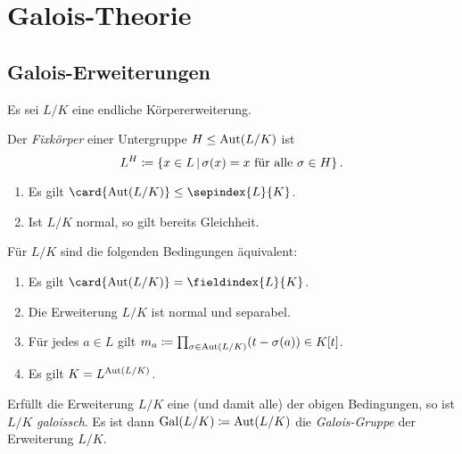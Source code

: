 \chapter{Galois-Theorie}





\section{Galois-Erweiterungen}

Es sei $L/K$ eine endliche Körpererweiterung.

\begin{definition}
  Der \emph{Fixkörper} einer Untergruppe $H \mathrel{\leq} \operatorname{Aut}(L/K)$ ist
  \[
              L^H
    \defined  \{
                x \in L
              \suchthat
                \text{$\sigma(x) = x$ für alle $\sigma \in H$}
              \} \,.
  \]

\end{definition}

\begin{lemma}
  \begin{enumerate}
    \item
      Es gilt $\card{\Aut{L/K}} \leq \sepindex{L}{K}$.
    \item
      Ist $L/K$ normal, so gilt bereits Gleichheit.
  \end{enumerate}
\end{lemma}


\begin{proposition}
  Für $L/K$ sind die folgenden Bedingungen äquivalent:
  \begin{enumerate}
    \item
      Es gilt $\card{\Aut{L/K}} = \fieldindex{L}{K}$.
    \item
      Die Erweiterung $L/K$ ist normal und separabel.
    \item
      Für jedes $a \in L$ gilt $m_a \coloneqq \prod_{\sigma \in \operatorname{Aut}(L/K)} (t - \sigma(a)) \in K[t]$.
    \item
      Es gilt $K = L^{\operatorname{Aut}(L/K)}$.
  \end{enumerate}
\end{proposition}

\begin{definition}
  Erfüllt die Erweiterung $L/K$ eine \textup(und damit alle\textup) der obigen Bedingungen, so ist $L/K$ \emph{galoissch}.
  Es ist dann $\operatorname{Gal}(L/K) \coloneqq \operatorname{Aut}(L/K)$ die \emph{Galois-Gruppe} der Erweiterung $L/K$.
\end{definition}

